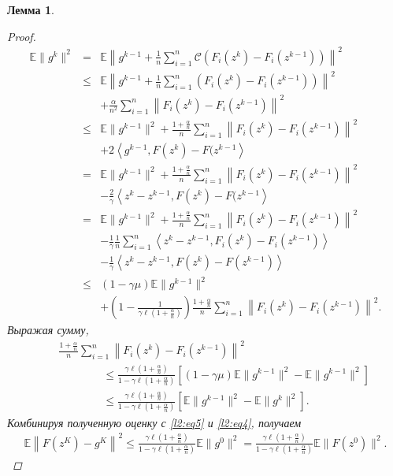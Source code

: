 \documentclass{ProcISPRAS}
\newtheorem{lemma}{Лемма}
\begin{document}
\begin{lemma}
\begin{proof}
\begin{eqnarray*}
    \mathbb E\| g^{k} \|^2 &=& \mathbb E\left\|g^{k-1} + \frac{1}{n}\sum\limits_{i=1}^n \mathcal{C}\left(F_i(z^{k}) - F_i(z^{k-1})\right)\right\|^2 \\
    &\leqslant& \mathbb E\left\|g^{k-1} + \frac{1}{n}\sum\limits_{i=1}^n \left(F_i(z^{k}) - F_i(z^{k-1})\right)\right\|^2 \\
    & & + \frac{\alpha}{n^2}\sum\limits_{i=1}^n\left\|F_i(z^{k}) - F_i(z^{k-1})\right\|^2\\
    &\leqslant& \mathbb E\|g^{k-1}\|^2 + \frac{1+\frac{\alpha}{n}}{n}\sum\limits_{i=1}^n\left\|F_i(z^k) - F_i(z^{k-1})\right\|^2\\
    & & + 2\left\langle g^{k-1}, F(z^k) - F(z^{k-1}\right\rangle\\
    &=& \mathbb E\|g^{k-1}\|^2 + \frac{1+\frac{\alpha}{n}}{n}\sum\limits_{i=1}^n\left\|F_i(z^k) - F_i(z^{k-1})\right\|^2 \\
    & & - \frac{2}{\gamma}\left\langle z^{k} - z^{k-1}, F(z^k) - F(z^{k-1}\right\rangle\\
    &=& \mathbb E\|g^{k-1}\|^2 + \frac{1+\frac{\alpha}{n}}{n}\sum\limits_{i=1}^n\left\|F_i(z^k) - F_i(z^{k-1})\right\|^2 \\
    & & - \frac{1}{\gamma}\frac{1}{n}\sum\limits_{i=1}^n\left\langle z^{k} - z^{k-1}, F_i(z^k) - F_i(z^{k-1})\right\rangle \\
    & &- \frac{1}{\gamma}\left\langle z^{k} - z^{k-1}, F(z^k) - F(z^{k-1})\right\rangle\\
    &\leqslant& (1-\gamma\mu)\mathbb E\|g^{k-1}\|^2 \\
    & & + \left(1 - \frac{1}{\gamma\ell\left(1+\frac{\alpha}{n}\right)}\right)\frac{1+\frac{\alpha}{n}}{n}\sum\limits_{i=1}^n\left\|F_i(z^k) - F_i(z^{k-1})\right\|^2.
\end{eqnarray*}
Выражая сумму,
\begin{eqnarray*}
    & &\frac{1+\frac{\alpha}{n}}{n}\sum\limits_{i=1}^n\left\|F_i(z^k) - F_i(z^{k-1})\right\|^2 \\
    & & \quad\quad\quad\quad\leqslant \frac{\gamma\ell\left(1+\frac{\alpha}{n}\right)}{1 - \gamma\ell\left(1+\frac{\alpha}{n}\right)} \left[(1-\gamma\mu)\mathbb E\|g^{k-1}\|^2 - \mathbb E\|g^{k-1}\|^2\right]\\
    & & \quad\quad\quad\quad\leqslant\frac{\gamma\ell\left(1+\frac{\alpha}{n}\right)}{1 - \gamma\ell\left(1+\frac{\alpha}{n}\right)}\left[\mathbb E\|g^{k-1}\|^2 - \mathbb E\|g^{k}\|^2\right].
\end{eqnarray*}
Комбинируя полученную оценку с \eqref{l2:eq5} и \eqref{l2:eq4}, получаем
\begin{eqnarray*}
    \mathbb E \left\|F(z^K) - g^{K}\right\|^2 \leqslant \frac{\gamma\ell\left(1+\frac{\alpha}{n}\right)}{1 - \gamma\ell\left(1+\frac{\alpha}{n}\right)} \mathbb E\|g^{0}\|^2 = \frac{\gamma\ell\left(1+\frac{\alpha}{n}\right)}{1 - \gamma\ell\left(1+\frac{\alpha}{n}\right)} \mathbb E\|F(z^0)\|^2.
\end{eqnarray*}
\end{proof}
\end{lemma}
\end{document}
